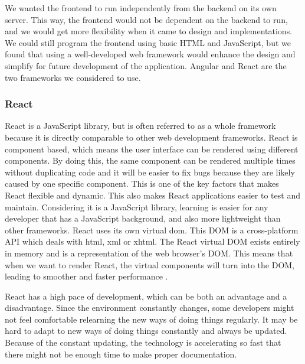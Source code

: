 We wanted the frontend to run independently from the backend on its own server. This way, the frontend would not be dependent on the backend to run, and we would get more flexibility when it came to design and implementations. We could still program the frontend using basic HTML and JavaScript, but we found that using a well-developed web framework would enhance the design and simplify for future development of the application. Angular and React are the two frameworks we considered to use. 

\subsubsection*{React}
React is a JavaScript library, but is often referred to as a whole framework because it is directly comparable to other web development frameworks. React is component based, which means the user interface can be rendered using different components. By doing this, the same component can be rendered multiple times without duplicating code and it will be easier to fix bugs because they are likely caused by one specific component. This is one of the key factors that makes React flexible and dynamic. This also makes React applications easier to test and maintain. Considering it is a JavaScript library, learning is easier for any developer that has a JavaScript background, and also more lightweight than other frameworks. React uses its own virtual \acrfull{dom}. This DOM is a cross-platform API which deals with \acrshort{html}, \acrshort{xml} or \acrshort{xhtml}. The React virtual DOM exists entirely in memory and is a representation of the web browser's DOM. This means that when we want to render React, the virtual components will turn into the DOM, leading to smoother and faster performance \cite{ReactProsAndCons}.

React has a high pace of development, which can be both an advantage and a disadvantage. Since the environment constantly changes, some developers might not feel comfortable relearning the new ways of doing things regularly. It may be hard to adapt to new ways of doing things constantly and always be updated. Because of the constant updating, the technology is accelerating so fast that there might not be enough time to make proper documentation.

